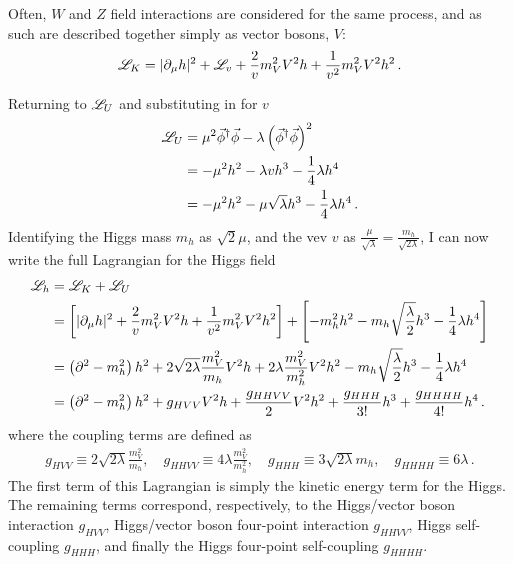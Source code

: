     Often, $W$ and $Z$ field interactions are considered for the same process,
        and as such are described together simply as vector bosons, $V$:
    \begin{equation} \begin{split}
        \mathscr{L}_K = | \partial_{\mu}h |^2 + \mathscr{L}_v
            + \frac{2}{v} m_V^2 V^2 h + \frac{1}{v^2} m_V^2 V^2 h^2
        \,.
    \end{split} \end{equation}

    \noindent Returning to $\mathscr{L}_U$ and substituting in for $v$
    \begin{equation} \begin{split}
        \mathscr{L}_U &= \mu^2 \vec{\phi}^\dag \vec{\phi} - \lambda \left( \vec{\phi}^\dag\vec{\phi} \right)^2
        \\&= - \mu^2 h^2 -\lambda v h^3 - \frac{1}{4} \lambda h^4
        \\&= - \mu^2 h^2 - \mu \sqrt\lambda h^3 - \frac{1}{4} \lambda h^4
        \,.
    \end{split} \end{equation}
    Identifying the Higgs mass $m_h$ as $\sqrt{2}\mu$,
        and the vev $v$ as $\frac{\mu}{\sqrt{\lambda}} = \frac{m_h}{\sqrt{2 \lambda}}$,
        I can now write the full Lagrangian for the Higgs field\cite{Halzen_book}
    \begin{equation} \begin{split} \label{eq:higgsfull}
        \mathscr{L}_h &= \mathscr{L}_K + \mathscr{L}_U
        \\&= \left[ | \partial_{\mu}h |^2
                + \frac{2}{v} m_V^2 V^2 h + \frac{1}{v^2} m_V^2 V^2 h^2
            \right]
            + \left[ - m^2_h h^2 - m_h \sqrt{\frac{\lambda}{2}} h^3 - \frac{1}{4} \lambda h^4 \right]
        \\&= \left(\partial^2 - m_h^2 \right) h^2
            + 2\sqrt{2\lambda} \frac{m_V^2}{m_h} V^2 h + 2 \lambda \frac{m_V^2}{m_h^2} V^2 h^2
            - m_h \sqrt{\frac{\lambda}{2}} h^3 - \frac{1}{4} \lambda h^4
        \\&= \left(\partial^2 - m_h^2 \right) h^2
            + g_{HVV} V^2 h + \frac{g_{HHVV}}{2} V^2 h^2
            + \frac{g_{HHH}}{3!} h^3 + \frac{g_{HHHH}}{4!} h^4
        \,.
    \end{split} \end{equation}
    where the coupling terms are defined as
    \begin{equation} \begin{split} \label{eq:higgscouplings}
        g_{HVV}  \equiv 2\sqrt{2\lambda} \frac{m_V^2}{m_h} ,\quad
        g_{HHVV} \equiv 4\lambda \frac{m_V^2}{m_h^2} ,\quad
        g_{HHH}  \equiv 3\sqrt{2\lambda} m_h ,\quad
        g_{HHHH} \equiv 6 \lambda \,.
    \end{split} \end{equation}
    The first term of this Lagrangian is simply the kinetic energy term for the Higgs.
    The remaining terms correspond, respectively,
        to the Higgs/vector boson interaction $g_{HVV}$,
        Higgs/vector boson four-point interaction $g_{HHVV}$,
        Higgs self-coupling $g_{HHH}$,
        and finally the Higgs four-point self-coupling $g_{HHHH}$.

